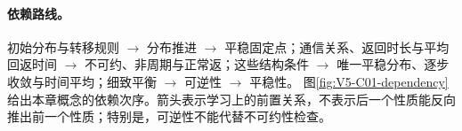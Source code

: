 \documentclass[UTF8,a4paper,11pt,openany]{ctexbook}
\begin{document}
\setcounter{page}{692}
\setcounter{chapter}{30}
\setcounter{figure}{0}
\pagestyle{headings}
\paragraph{依赖路线。}初始分布与转移规则 $\to$ 分布推进 $\to$ 平稳固定点；通信关系、返回时长与平均回返时间 $\to$ 不可约、非周期与正常返；这些结构条件 $\to$ 唯一平稳分布、逐步收敛与时间平均；细致平衡 $\to$ 可逆性 $\to$ 平稳性。
图\ref{fig:V5-C01-dependency}给出本章概念的依赖次序。箭头表示学习上的前置关系，不表示后一个性质能反向推出前一个性质；特别是，可逆性不能代替不可约性检查。

\end{document}
